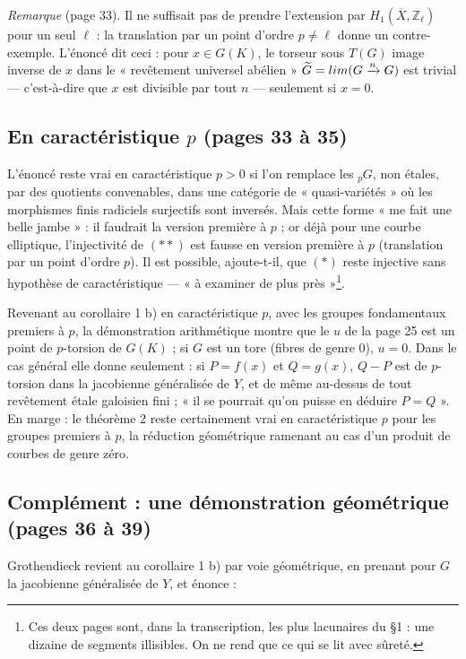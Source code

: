 \documentclass[11pt,a4paper]{article}
\begin{document}
\emph{Remarque} (page 33). Il ne suffisait pas de prendre l'extension par
$H_1(\overline{X}, \mathbb{Z}_\ell)$ pour un seul $\ell$ : la translation par
un point d'ordre $p \ne \ell$ donne un contre-exemple. L'énoncé dit ceci :
pour $x \in G(K)$, le torseur sous $T(G)$ image inverse de $x$ dans le
« revêtement universel abélien » $\widetilde{G} = \varprojlim (G
\xrightarrow{n} G)$ est trivial — c'est-à-dire que $x$ est divisible par tout
$n$ — seulement si $x = 0$.

\subsection*{En caractéristique $p$ (pages 33 à 35)}

L'énoncé reste vrai en caractéristique $p > 0$ si l'on remplace les ${}_pG$,
non étales, par des quotients convenables, dans une catégorie de
« quasi-variétés » où les morphismes finis radiciels surjectifs sont inversés.
Mais cette forme « me fait une belle jambe » : il faudrait la version
première à $p$ ; or déjà pour une courbe elliptique, l'injectivité de
$(\ast\ast)$ est fausse en version première à $p$ (translation par un point
d'ordre $p$). Il est possible, ajoute-t-il, que $(\ast)$ reste injective sans
hypothèse de caractéristique — « à examiner de plus près »\footnote{Ces deux
pages sont, dans la transcription, les plus lacunaires du §1 : une dizaine de
segments illisibles. On ne rend que ce qui se lit avec sûreté.}.

Revenant au corollaire 1 b) en caractéristique $p$, avec les groupes
fondamentaux premiers à $p$, la démonstration arithmétique montre que le $u$
de la page 25 est un point de $p$-torsion de $G(K)$ ; si $G$ est un tore (fibres
de genre $0$), $u = 0$. Dans le cas général elle donne seulement : si $P =
f(x)$ et $Q = g(x)$, $Q - P$ est de $p$-torsion dans la jacobienne généralisée
de $Y$, et de même au-dessus de tout revêtement étale galoisien fini ; « il se
pourrait qu'on puisse en déduire $P = Q$ ». En marge : le théorème 2 reste
certainement vrai en caractéristique $p$ pour les groupes premiers à $p$, la
réduction géométrique ramenant au cas d'un produit de courbes de genre
zéro.

\subsection*{Complément : une démonstration géométrique (pages 36 à 39)}

Grothendieck revient au corollaire 1 b) par voie géométrique, en prenant pour
$G$ la jacobienne généralisée de $Y$, et énonce :
\end{document}
